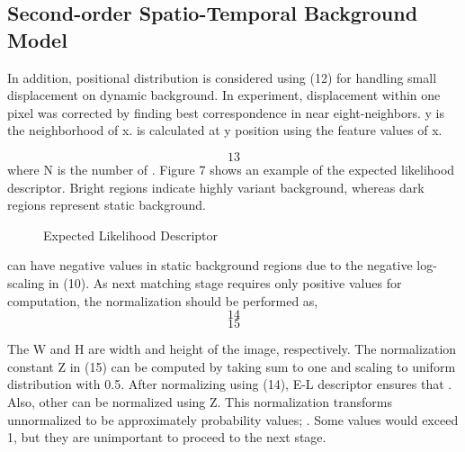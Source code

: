 \documentclass[conference]{IEEEtran}
\begin{document}
\subsection{Second-order Spatio-Temporal Background Model}
In addition, positional distribution is considered using (12) for handling small displacement on dynamic background. In experiment, displacement within one pixel was corrected by finding best correspondence in near eight-neighbors. y is the neighborhood of x.   is calculated at y position using the feature values of x.

\begin{equation}
  13
\end{equation}
where N is the number of  . Figure 7 shows an example of the expected likelihood descriptor. Bright regions indicate highly variant background, whereas dark regions represent static background.

\begin{figure}[!t]
  \centering
  \label{fig:70}
  \hfill
  \hfill
  \caption{Expected Likelihood Descriptor}
\end{figure}
  can have negative values in static background regions due to the negative log-scaling in (10). As next matching stage requires only positive values for computation, the normalization should be performed as,
\begin{equation}
  14
\end{equation}
\begin{equation}
  15
\end{equation}

The W and H are width and height of the image, respectively. The normalization constant Z in (15) can be computed by taking sum to one and scaling to uniform distribution with 0.5. After normalizing   using (14), E-L descriptor ensures that  . Also, other   can be normalized using Z. This normalization transforms unnormalized   to be approximately probability values;  . Some values would exceed 1, but they are unimportant to proceed to the next stage.
\end{document}
